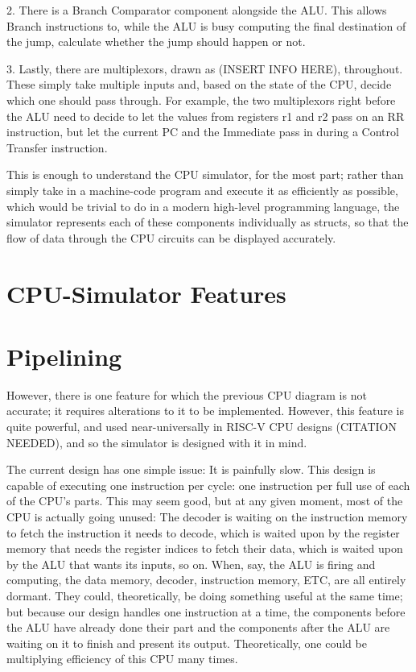 \documentclass[12pt,twoside]{reedthesis}
\begin{document}
2. There is a Branch Comparator component alongside the ALU. This allows Branch instructions to, while the ALU is busy computing the final destination of the jump, calculate whether the jump should happen or not.

3. Lastly, there are multiplexors, drawn as (INSERT INFO HERE), throughout. These simply take multiple inputs and, based on the state of the CPU, decide which one should pass through. For example, the two multiplexors right before the ALU need to decide to let the values from registers r1 and r2 pass on an RR instruction, but let the current PC and the Immediate pass in during a Control Transfer instruction.

This is enough to understand the CPU simulator, for the most part; rather than simply take in a machine-code program and execute it as efficiently as possible, which would be trivial to do in a modern high-level programming language, the simulator represents each of these components individually as structs, so that the flow of data through the CPU circuits can be displayed accurately. 

\section{CPU-Simulator Features}

\section{Pipelining}

However, there is one feature for which the previous CPU diagram is not accurate; it requires alterations to it to be implemented. However, this feature is quite powerful, and used near-universally in RISC-V CPU designs (CITATION NEEDED), and so the simulator is designed with it in mind.

The current design has one simple issue: It is painfully slow. This design is capable of executing one instruction per cycle: one instruction per full use of each of the CPU's parts. This may seem good, but at any given moment, most of the CPU is actually going unused: The decoder is waiting on the instruction memory to fetch the instruction it needs to decode, which is waited upon by the register memory that needs the register indices to fetch their data, which is waited upon by the ALU that wants its inputs, so on. When, say, the ALU is firing and computing, the data memory, decoder, instruction memory, ETC, are all entirely dormant. They could, theoretically, be doing something useful at the same time; but because our design handles one instruction at a time, the components before the ALU have already done their part and the components after the ALU are waiting on it to finish and present its output. Theoretically, one could be multiplying efficiency of this CPU many times.
\end{document}
